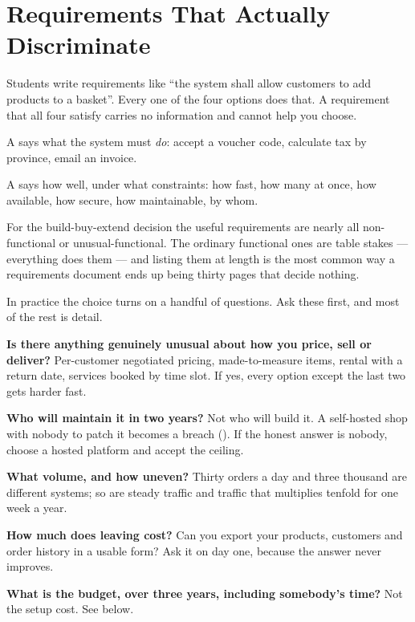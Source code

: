 \section{Requirements That Actually Discriminate}

Students write requirements like ``the system shall allow customers to add
products to a basket''. Every one of the four options does that. A requirement
that all four satisfy carries no information and cannot help you choose.

\begin{definitionbox}
A  says what the system must \emph{do}: accept a
voucher code, calculate tax by province, email an invoice.

\smallskip
A  says how well, under what constraints: how
fast, how many at once, how available, how secure, how maintainable, by whom.

\smallskip
For the build-buy-extend decision the useful requirements are nearly all
non-functional or unusual-functional. The ordinary functional ones are table
stakes --- everything does them --- and listing them at length is the most
common way a requirements document ends up being thirty pages that decide
nothing.
\end{definitionbox}

\begin{conceptbox}
In practice the choice turns on a handful of questions. Ask these first, and
most of the rest is detail.

\begin{tightnum}
  \item \textbf{Is there anything genuinely unusual about how you price, sell
        or deliver?} Per-customer negotiated pricing, made-to-measure items,
        rental with a return date, services booked by time slot. If yes, every
        option except the last two gets harder fast.
  \item \textbf{Who will maintain it in two years?} Not who will build it. A
        self-hosted shop with nobody to patch it becomes a breach
        (). If the honest answer is nobody, choose a hosted
        platform and accept the ceiling.
  \item \textbf{What volume, and how uneven?} Thirty orders a day and three
        thousand are different systems; so are steady traffic and traffic that
        multiplies tenfold for one week a year.
  \item \textbf{How much does leaving cost?} Can you export your products,
        customers and order history in a usable form? Ask it on day one,
        because the answer never improves.
  \item \textbf{What is the budget, over three years, including somebody's
        time?} Not the setup cost. See below.
\end{tightnum}
\end{conceptbox}

